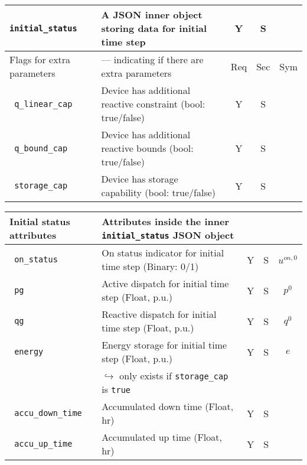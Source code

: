 \documentclass{article}
\begin{document}
\begin{center}
\begin{tabular}{ l | l | c | c | c |}
  
  {\tt initial\_status} & A JSON inner object storing data for initial time step & Y & S &  \\
   \hline
   Flags for extra parameters & --- indicating if there are extra parameters & Req & Sec & Sym\\
   \hline
     {\tt\color{red} q\_linear\_cap}      & Device has additional reactive constraint (bool: true/false) & Y & S & \\
  {\tt\color{red} q\_bound\_cap}       & Device has additional reactive bounds (bool: true/false) & Y & S & \\
  {\tt\color{red} storage\_cap}       & Device has storage capability (bool: true/false) & Y & S & \\
  \hline   
\end{tabular}
\end{center}

\begin{center}
\small
\begin{tabular}{ l | l | c | c | c |}
\hline
  Initial status attributes &  Attributes inside the inner {\tt initial\_status} JSON object &  &  & \\
  \hline    
  {\tt\color{red} on\_status} & On status indicator for initial time step (Binary: 0/1) & Y & S & $u^{on,0}$\\
  {\tt\color{red} pg} & Active dispatch for initial time step (Float, p.u.) & Y & S & $p^0$ \\
  {\tt\color{red} qg} & Reactive dispatch for initial time step (Float, p.u.)& Y & S & $q^0$ \\
  {\tt\color{red} energy} & Energy storage for initial time step (Float, p.u.)& Y & S & $e$\\  
                          & $\hookrightarrow$ only exists if \texttt{storage\_cap} is \texttt{true} & & & \\  
  {\tt\color{red} accu\_down\_time} & Accumulated down time (Float, hr) & Y & S & \\  
  {\tt\color{red} accu\_up\_time} & Accumulated up time (Float, hr) & Y & S & \\  
 \hline
\end{tabular}
\end{center}
\end{document}
